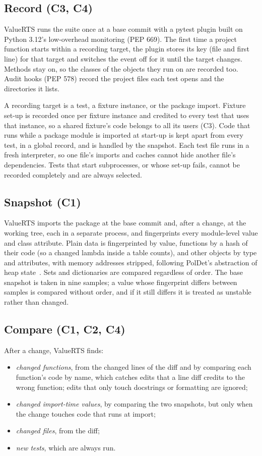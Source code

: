 \documentclass[acmsmall,screen,review,anonymous]{acmart}
\newcommand{\tool}{ValueRTS\xspace}
\begin{document}
\subsection{Record (C3, C4)}
\tool runs the suite once at a base commit with a pytest plugin built on Python 3.12's low-overhead monitoring (PEP 669). The first time a project function starts within a recording target, the plugin stores its key (file and first line) for that target and switches the event off for it until the target changes. Methods stay on, so the classes of the objects they run on are recorded too. Audit hooks (PEP 578) record the project files each test opens and the directories it lists.

A recording target is a test, a fixture instance, or the package import. Fixture set-up is recorded once per fixture instance and credited to every test that uses that instance, so a shared fixture's code belongs to all its users (C3). Code that runs while a package module is imported at start-up is kept apart from every test, in a global record, and is handled by the snapshot. Each test file runs in a fresh interpreter, so one file's imports and caches cannot hide another file's dependencies. Tests that start subprocesses, or whose set-up fails, cannot be recorded completely and are always selected.


\subsection{Snapshot (C1)}
\tool imports the package at the base commit and, after a change, at the working tree, each in a separate process, and fingerprints every module-level value and class attribute. Plain data is fingerprinted by value, functions by a hash of their code (so a changed lambda inside a table counts), and other objects by type and attributes, with memory addresses stripped, following PolDet's abstraction of heap state~\cite{gyori2015poldet}. Sets and dictionaries are compared regardless of order. The base snapshot is taken in nine samples; a value whose fingerprint differs between samples is compared without order, and if it still differs it is treated as unstable rather than changed.


\subsection{Compare (C1, C2, C4)}
After a change, \tool finds:

\begin{itemize}
  \item \emph{changed functions}, from the changed lines of the diff and by comparing each function's code by name, which catches edits that a line diff credits to the wrong function; edits that only touch docstrings or formatting are ignored;
  \item \emph{changed import-time values}, by comparing the two snapshots, but only when the change touches code that runs at import;
  \item \emph{changed files}, from the diff;
  \item \emph{new tests}, which are always run.
\end{itemize}
\end{document}
